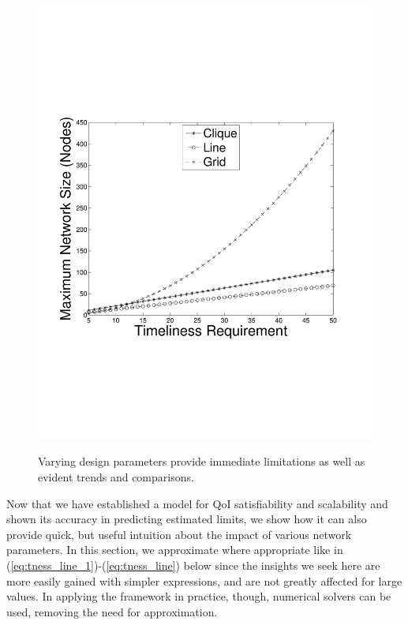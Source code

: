 \begin{figure}
{	\includegraphics[scale=0.23, clip=true, trim=14mm 65mm 20mm 65mm]{figures/use_cases_examples/num_nodes_vs_tness_5_SS_12_IS.pdf}
        \label{fig:use_case_num_nodes_vs_qoi_2}
        }

   \caption{Varying design parameters provide immediate limitations as well as evident trends and comparisons.}
   \label{fig:huh_net_design}
   \vspace{-5mm}
\end{figure}
 
Now that we have established a model for QoI satisfiability and scalability and shown its accuracy in predicting estimated limits, we show how it can also provide quick, but useful intuition about the impact of various network parameters.  In this section, we approximate where appropriate like in (\ref{eq:tness_line_1})-(\ref{eq:tness_line}) below since the insights we seek here are more easily gained with simpler expressions, and are not greatly affected for large values.  In applying the framework in practice, though, numerical solvers can be used, removing the need for approximation.    


